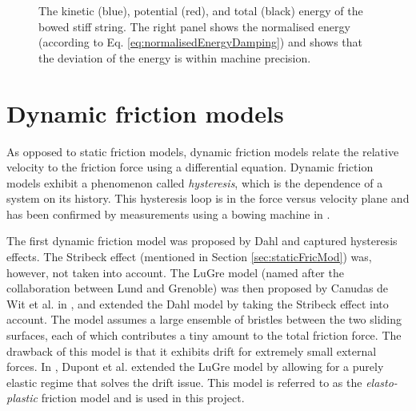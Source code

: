 \begin{figure}[h]
    \centering
      \caption{The kinetic (blue), potential (red), and total (black) energy of the bowed stiff string. The right panel shows the normalised energy (according to Eq. \eqref{eq:normalisedEnergyDamping}) and shows that the deviation of the energy is within machine precision. \label{fig:energyStaticBow}}
\end{figure}

\section{Dynamic friction models}
As opposed to static friction models, dynamic friction models relate the relative velocity to the friction force using a differential equation. Dynamic friction models exhibit a phenomenon called \textit{hysteresis}, which is the dependence of a system on its history. This hysteresis loop is in the force versus velocity plane and has been confirmed by measurements using a bowing machine in \cite{Woodhouse2003}.

The first dynamic friction model was proposed by Dahl \cite{Dahl1968} and captured hysteresis effects. The Stribeck effect (mentioned in Section \ref{sec:staticFricMod}) was, however, not taken into account. The LuGre model (named after the collaboration between Lund and Grenoble) was then proposed by Canudas de Wit et al. in \cite{Canudas1993, Canudas1995}, and extended the Dahl model by taking the Stribeck effect into account. The model assumes a large ensemble of bristles between the two sliding surfaces, each of which contributes a tiny amount to the total friction force. The drawback of this model is that it exhibits drift for extremely small external forces. In \cite{Dupont2002}, Dupont et al. extended the LuGre model by allowing for a purely elastic regime that solves the drift issue. This model is referred to as the \textit{elasto-plastic} friction model and is used in this project.

